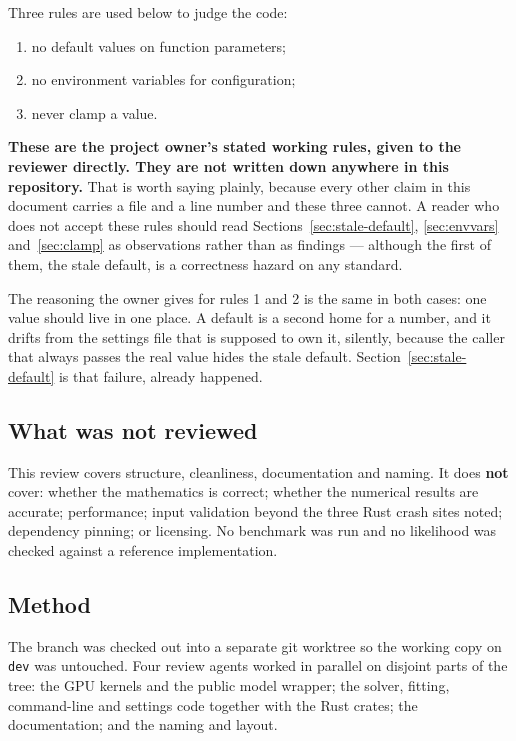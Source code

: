 \documentclass[11pt]{article}
\begin{document}
Three rules are used below to judge the code:

\begin{enumerate}
  \item no default values on function parameters;
  \item no environment variables for configuration;
  \item never clamp a value.
\end{enumerate}

\textbf{These are the project owner's stated working rules, given to the
reviewer directly.  They are not written down anywhere in this repository.}  That
is worth saying plainly, because every other claim in this document carries a
file and a line number and these three cannot.  A reader who does not accept
these rules should read Sections~\ref{sec:stale-default},
\ref{sec:envvars} and~\ref{sec:clamp} as observations rather than as findings
--- although the first of them, the stale default, is a correctness hazard on
any standard.

The reasoning the owner gives for rules 1 and 2 is the same in both cases: one
value should live in one place.  A default is a second home for a number, and it
drifts from the settings file that is supposed to own it, silently, because the
caller that always passes the real value hides the stale default.
Section~\ref{sec:stale-default} is that failure, already happened.

\subsection{What was not reviewed}

This review covers structure, cleanliness, documentation and naming.  It does
\textbf{not} cover: whether the mathematics is correct; whether the numerical
results are accurate; performance; input validation beyond the three Rust
crash sites noted; dependency pinning; or licensing.  No benchmark was run and
no likelihood was checked against a reference implementation.

\subsection{Method}

The branch was checked out into a separate git worktree so the working copy on
\texttt{dev} was untouched.  Four review agents worked in parallel on disjoint
parts of the tree: the GPU kernels and the public model wrapper; the solver,
fitting, command-line and settings code together with the Rust crates; the
documentation; and the naming and layout.
\end{document}
